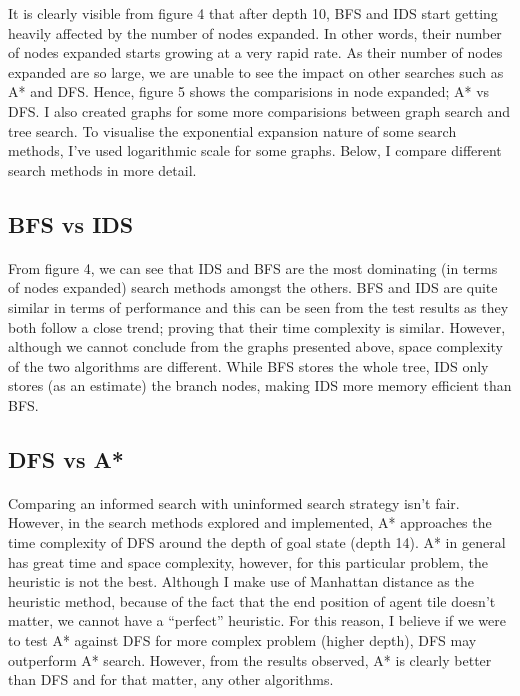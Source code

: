 \documentclass[10pt]{article}
\begin{document}
  \newpage
  It is clearly visible from figure 4 that after depth 10, BFS and IDS start getting heavily affected by the number of nodes expanded. In other words, their number of nodes expanded starts growing at a very rapid rate. As their number of nodes expanded are so large, we are unable to see the impact on other searches such as A* and DFS. Hence, figure 5 shows the comparisions in node expanded; A* vs DFS. I also created graphs for some more comparisions between graph search and tree search. To visualise the exponential expansion nature of some search methods, I’ve used logarithmic scale for some graphs. Below, I compare different search methods in more detail.

  \subsection{BFS vs IDS}
  \paragraph{} \indent
  From figure 4, we can see that IDS and BFS are the most dominating (in terms of nodes expanded) search methods amongst the others. BFS and IDS are quite similar in terms of performance and this can be seen from the test results as they both follow a close trend; proving that their time complexity is similar. However, although we cannot conclude from the graphs presented above, space complexity of the two algorithms are different. While BFS stores the whole tree, IDS only stores (as an estimate) the branch nodes, making IDS more memory efficient than BFS. 

  \subsection{DFS vs A*}
  \paragraph{} \indent
  Comparing an informed search with uninformed search strategy isn't fair. However, in the search methods explored and implemented, A* approaches the time complexity of DFS around the depth of goal state (depth 14). A* in general has great time and space complexity, however, for this particular problem, the heuristic is not the best. Although I make use of Manhattan distance as the heuristic method, because of the fact that the end position of agent tile doesn’t matter, we cannot have a ``perfect'' heuristic. For this reason, I believe if we were to test A* against DFS for more complex problem (higher depth), DFS may outperform A* search. However,
  from the results observed, A* is clearly better than DFS and for that matter, any other algorithms.
\end{document}
